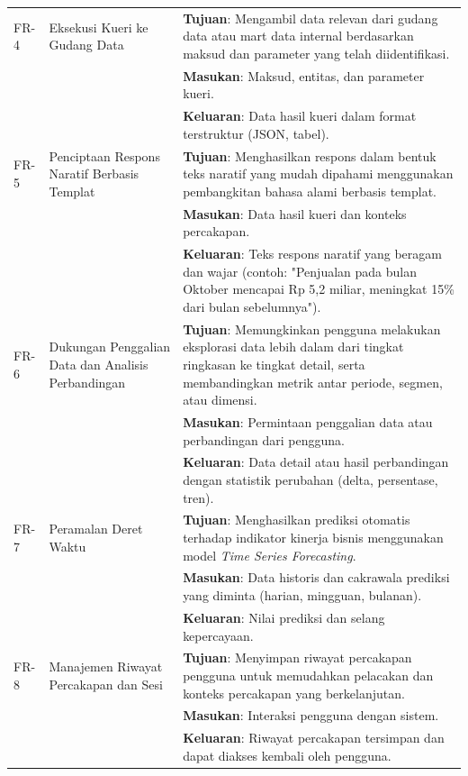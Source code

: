 \begin{longtable}{|p{1.3cm}|p{4.5cm}|p{7cm}|}
FR-4 & Eksekusi Kueri ke Gudang Data & 
\textbf{Tujuan}: Mengambil data relevan dari gudang data atau mart data internal berdasarkan maksud dan parameter yang telah diidentifikasi. \\
& & \textbf{Masukan}: Maksud, entitas, dan parameter kueri. \\
& & \textbf{Keluaran}: Data hasil kueri dalam format terstruktur (JSON, tabel). \\
\hline

FR-5 & Penciptaan Respons Naratif Berbasis Templat & 
\textbf{Tujuan}: Menghasilkan respons dalam bentuk teks naratif yang mudah dipahami menggunakan pembangkitan bahasa alami berbasis templat. \\
& & \textbf{Masukan}: Data hasil kueri dan konteks percakapan. \\
& & \textbf{Keluaran}: Teks respons naratif yang beragam dan wajar (contoh: "Penjualan pada bulan Oktober mencapai Rp 5,2 miliar, meningkat 15\% dari bulan sebelumnya"). \\
\hline

FR-6 & Dukungan Penggalian Data dan Analisis Perbandingan & 
\textbf{Tujuan}: Memungkinkan pengguna melakukan eksplorasi data lebih dalam dari tingkat ringkasan ke tingkat detail, serta membandingkan metrik antar periode, segmen, atau dimensi. \\
& & \textbf{Masukan}: Permintaan penggalian data atau perbandingan dari pengguna. \\
& & \textbf{Keluaran}: Data detail atau hasil perbandingan dengan statistik perubahan (delta, persentase, tren). \\
\hline

FR-7 & Peramalan Deret Waktu & 
\textbf{Tujuan}: Menghasilkan prediksi otomatis terhadap indikator kinerja bisnis menggunakan model \textit{Time Series Forecasting}. \\
& & \textbf{Masukan}: Data historis dan cakrawala prediksi yang diminta (harian, mingguan, bulanan). \\
& & \textbf{Keluaran}: Nilai prediksi dan selang kepercayaan. \\
\hline

FR-8 & Manajemen Riwayat Percakapan dan Sesi & 
\textbf{Tujuan}: Menyimpan riwayat percakapan pengguna untuk memudahkan pelacakan dan konteks percakapan yang berkelanjutan. \\
& & \textbf{Masukan}: Interaksi pengguna dengan sistem. \\
& & \textbf{Keluaran}: Riwayat percakapan tersimpan dan dapat diakses kembali oleh pengguna. \\
\hline


\end{longtable}
